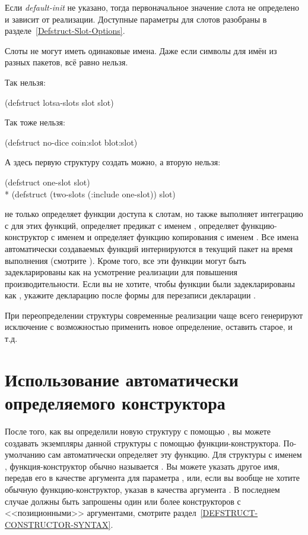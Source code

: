\begin{defmac}
Если \emph{default-init} не указано, тогда первоначальное значение слота не
определено и зависит от реализации. Доступные параметры для слотов разобраны в
разделе~\ref{Defstruct-Slot-Options}.

Слоты не могут иметь одинаковые имена. Даже если символы для имён из
разных пакетов, всё равно нельзя.

Так нельзя:
\begin{lisp}
(defstruct lotsa-slots slot slot)
\end{lisp}

Так тоже нельзя:
\begin{lisp}
(defstruct no-dice coin:slot blot:slot)
\end{lisp}
А здесь первую структуру создать можно, а вторую нельзя:
\begin{lisp}
(defstruct one-slot slot) \\*
(defstruct (two-slots (:include one-slot)) slot)
\end{lisp}

 не только определяет функции доступа к слотам, но также
выполняет интеграцию с  для этих функций, определяет предикат с
именем , определяет функцию-конструктор с именем
 и определяет функцию копирования с именем
.
Все имена автоматически создаваемых функций интернируются в текущий пакет на время
выполнения  (смотрите ).
Кроме того, все эти функции могут быть задекларированы как  на
усмотрение реализации для повышения производительности.
Если вы не хотите, чтобы функции были задекларированы как , укажите
декларацию  после формы  для перезаписи декларации
.

При переопределении структуры современные реализации чаще всего
генерируют исключение с возможностью применить новое определение,
оставить старое, и т.д.
\end{defmac}

\section{Использование автоматически определяемого конструктора}

После того, как вы определили новую структуру с помощью
, вы можете создавать экземпляры данной структуры с
помощью функции-конструктора.  По-умолчанию  сам
автоматически определяет эту функцию.  Для структуры с именем
, функция-конструктор обычно называется .
Вы можете указать другое имя, передав его в качестве аргумента для
параметра , или, если вы вообще не хотите обычную
функцию-конструктор, указав в качества аргумента {\false}.  В
последнем случае должны быть запрошены один или более конструкторов с
<<позиционными>> аргументами, смотрите
раздел~\ref{DEFSTRUCT-CONSTRUCTOR-SYNTAX}.

